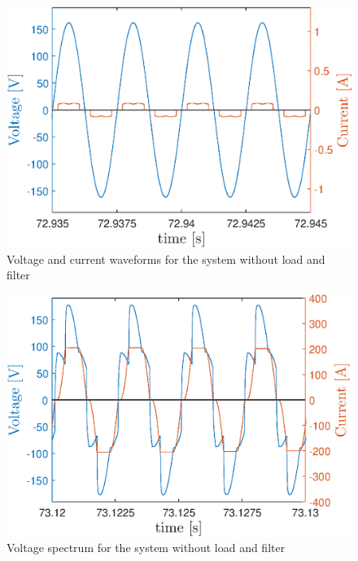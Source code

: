\begin{figure}[!h] %
	\centering
	\includegraphics[width=0.27\textheight]{Figures/artigo_unfilt_1.eps}
	\caption{Voltage and current waveforms for the system without load and filter}
	\label{fig:artigo_unfilt_1.eps}
\end{figure}

\begin{figure}[!h] %
	\centering
	\includegraphics[width=0.27\textheight]{Figures/artigo_unfilt_2.eps}
	\caption{Voltage spectrum for the system without load and filter}
	\label{fig:artigo_unfilt_2.eps}
\end{figure}

